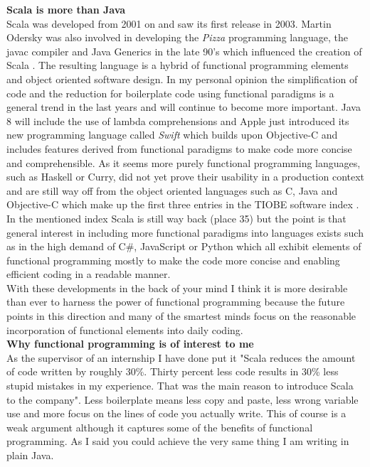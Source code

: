 \documentclass[11p]{scrartcl}
\begin{document}
\textbf{Scala is more than Java}\\
Scala was developed from 2001 on and saw its first release in 2003. Martin Odersky was also involved in developing the \textit{Pizza} programming language, the javac compiler and Java Generics in the late 90's which influenced the creation of Scala \cite{link:scalaHistory}.
The resulting language is a hybrid of functional programming elements and object oriented software design. In my personal opinion the simplification of code and the reduction for boilerplate code using functional paradigms is a general trend in the last years and will continue to become more important. Java 8 will include the use of lambda comprehensions and Apple just introduced its new programming language called \textit{Swift} which builds upon Objective-C and includes features derived from functional paradigms to make code more concise and comprehensible. 
As it seems more purely functional programming languages, such as Haskell or Curry, did not yet prove their usability in a production context and are still way off from the object oriented languages such as C, Java and Objective-C which make up the first three entries in the TIOBE software index \cite{link:tiobeIndex}.
In the mentioned index Scala is still way back (place 35) but the point is that general interest in including more functional paradigms into languages exists such as in the high demand of C\#, JavaScript or Python which all exhibit elements of functional programming mostly to make the code more concise and enabling efficient coding in a readable manner.\\
With these developments in the back of your mind I think it is more desirable than ever to harness the power of functional programming because the future points in this direction and many of the smartest minds focus on the reasonable incorporation of functional elements into daily coding.\\

\textbf{Why functional programming is of interest to me}\\
As the supervisor of an internship I have done put it "Scala reduces the amount of code written by roughly 30\%. Thirty percent less code results in 30\% less stupid mistakes in my experience. That was the main reason to introduce Scala to the company". Less boilerplate means less copy and paste, less wrong variable use and more focus on the lines of code you actually write.
This of course is a weak argument although it captures some of the benefits of functional programming. As I said you could achieve the very same thing I am writing in plain Java.\\
\end{document}
